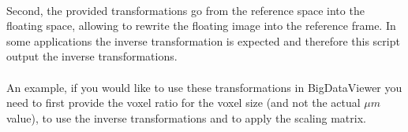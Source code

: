 \documentclass[10pt,a4paper]{book}
\begin{document}
\paragraph{}Second, the provided transformations go from the reference space into the floating space, allowing to rewrite the floating image into the reference frame. In some applications the inverse transformation is expected and therefore this script output the inverse transformations.
\paragraph{}An example, if you would like to use these transformations in BigDataViewer you need to first provide the voxel ratio for the voxel size (and not the actual $\mu m$ value), to use the inverse transformations and to apply the scaling matrix.


\end{document}
